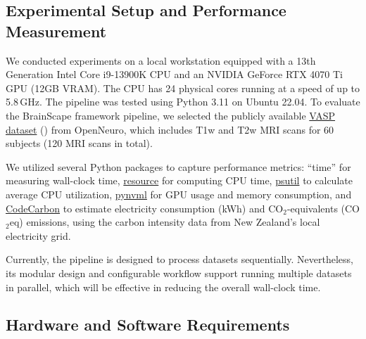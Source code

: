 \subsection{Experimental Setup and Performance Measurement}

We conducted experiments on a local workstation equipped with a 13th Generation Intel Core i9-13900K CPU 
and an NVIDIA GeForce RTX 4070 Ti GPU (12GB VRAM). 
The CPU has 24 physical cores running at a speed of up to 5.8\,GHz. 
The pipeline was tested using Python 3.11 on Ubuntu 22.04.
To evaluate the BrainScape framework pipeline, 
we selected the publicly available \href{https://openneuro.org/datasets/ds003717}{VASP dataset} (\cite{peelle2022increased}) from OpenNeuro, 
which includes T1w and T2w MRI scans for 60 subjects (120 MRI scans in total). 

We utilized several Python packages to capture performance metrics: 
``time'' for measuring wall-clock time, 
\href{https://docs.python.org/3/library/resource.html}{resource} for computing CPU time,
\href{https://pypi.org/project/psutil/}{psutil} to calculate average CPU utilization, 
\href{https://pypi.org/project/pynvml/}{pynvml} for GPU usage and memory consumption, and 
\href{https://pypi.org/project/codecarbon/}{CodeCarbon} to estimate electricity consumption (kWh) and CO$_2$-equivalents (CO$_2$eq) emissions, 
using the carbon intensity data from New Zealand's local electricity grid.

Currently, the pipeline is designed to process datasets sequentially. 
Nevertheless, its modular design and configurable workflow support running multiple datasets in parallel, 
which will be effective in reducing the overall wall-clock time.


\subsection{Hardware and Software Requirements}

